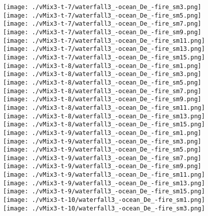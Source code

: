 \begin{figure}[ht!]
{    \texttt{[image: ./vMix3-t-7/waterfall3\_-ocean\_De\_-fire\_sm3.png]}
    \texttt{[image: ./vMix3-t-7/waterfall3\_-ocean\_De\_-fire\_sm5.png]}
    \texttt{[image: ./vMix3-t-7/waterfall3\_-ocean\_De\_-fire\_sm7.png]}
    \texttt{[image: ./vMix3-t-7/waterfall3\_-ocean\_De\_-fire\_sm9.png]}
    \texttt{[image: ./vMix3-t-7/waterfall3\_-ocean\_De\_-fire\_sm11.png]}
    \texttt{[image: ./vMix3-t-7/waterfall3\_-ocean\_De\_-fire\_sm13.png]}
    \texttt{[image: ./vMix3-t-7/waterfall3\_-ocean\_De\_-fire\_sm15.png]} \\
\vspace{1mm}
    \texttt{[image: ./vMix3-t-8/waterfall3\_-ocean\_De\_-fire\_sm1.png]}
    \texttt{[image: ./vMix3-t-8/waterfall3\_-ocean\_De\_-fire\_sm3.png]}
    \texttt{[image: ./vMix3-t-8/waterfall3\_-ocean\_De\_-fire\_sm5.png]}
    \texttt{[image: ./vMix3-t-8/waterfall3\_-ocean\_De\_-fire\_sm7.png]}
    \texttt{[image: ./vMix3-t-8/waterfall3\_-ocean\_De\_-fire\_sm9.png]}
    \texttt{[image: ./vMix3-t-8/waterfall3\_-ocean\_De\_-fire\_sm11.png]}
    \texttt{[image: ./vMix3-t-8/waterfall3\_-ocean\_De\_-fire\_sm13.png]}
    \texttt{[image: ./vMix3-t-8/waterfall3\_-ocean\_De\_-fire\_sm15.png]} \\
\vspace{1mm}
    \texttt{[image: ./vMix3-t-9/waterfall3\_-ocean\_De\_-fire\_sm1.png]}
    \texttt{[image: ./vMix3-t-9/waterfall3\_-ocean\_De\_-fire\_sm3.png]}
    \texttt{[image: ./vMix3-t-9/waterfall3\_-ocean\_De\_-fire\_sm5.png]}
    \texttt{[image: ./vMix3-t-9/waterfall3\_-ocean\_De\_-fire\_sm7.png]}
    \texttt{[image: ./vMix3-t-9/waterfall3\_-ocean\_De\_-fire\_sm9.png]}
    \texttt{[image: ./vMix3-t-9/waterfall3\_-ocean\_De\_-fire\_sm11.png]}
    \texttt{[image: ./vMix3-t-9/waterfall3\_-ocean\_De\_-fire\_sm13.png]}
    \texttt{[image: ./vMix3-t-9/waterfall3\_-ocean\_De\_-fire\_sm15.png]} \\
\vspace{1mm}
    \texttt{[image: ./vMix3-t-10/waterfall3\_-ocean\_De\_-fire\_sm1.png]}
    \texttt{[image: ./vMix3-t-10/waterfall3\_-ocean\_De\_-fire\_sm3.png]}
}
\end{figure}
